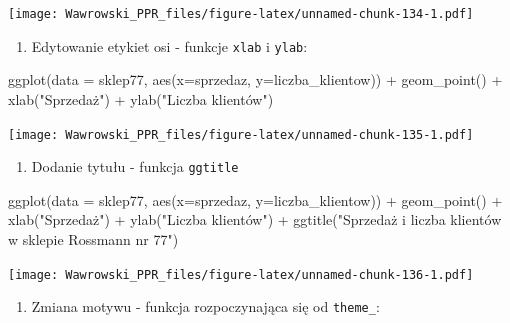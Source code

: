 \documentclass[
]{book}
\newenvironment{Shaded}{\begin{snugshade}}{\end{snugshade}}
\newcommand{\AttributeTok}[1]{\textcolor[rgb]{0.77,0.63,0.00}{#1}}
\newcommand{\FunctionTok}[1]{\textcolor[rgb]{0.00,0.00,0.00}{#1}}
\newcommand{\NormalTok}[1]{#1}
\newcommand{\SpecialCharTok}[1]{\textcolor[rgb]{0.00,0.00,0.00}{#1}}
\newcommand{\StringTok}[1]{\textcolor[rgb]{0.31,0.60,0.02}{#1}}
\providecommand{\tightlist}{%
  \setlength{\itemsep}{0pt}\setlength{\parskip}{0pt}}
\begin{document}
\texttt{[image: Wawrowski\_PPR\_files/figure-latex/unnamed-chunk-134-1.pdf]}

\begin{enumerate}
\def\labelenumi{\arabic{enumi}.}
\setcounter{enumi}{2}
\tightlist
\item
  Edytowanie etykiet osi - funkcje \texttt{xlab} i \texttt{ylab}:
\end{enumerate}

\begin{Shaded}
\begin{Highlighting}[]
\FunctionTok{ggplot}\NormalTok{(}\AttributeTok{data =}\NormalTok{ sklep77, }\FunctionTok{aes}\NormalTok{(}\AttributeTok{x=}\NormalTok{sprzedaz, }\AttributeTok{y=}\NormalTok{liczba\_klientow)) }\SpecialCharTok{+}
  \FunctionTok{geom\_point}\NormalTok{() }\SpecialCharTok{+}
  \FunctionTok{xlab}\NormalTok{(}\StringTok{"Sprzedaż"}\NormalTok{) }\SpecialCharTok{+}
  \FunctionTok{ylab}\NormalTok{(}\StringTok{"Liczba klientów"}\NormalTok{)}
\end{Highlighting}
\end{Shaded}

\texttt{[image: Wawrowski\_PPR\_files/figure-latex/unnamed-chunk-135-1.pdf]}

\begin{enumerate}
\def\labelenumi{\arabic{enumi}.}
\setcounter{enumi}{3}
\tightlist
\item
  Dodanie tytułu - funkcja \texttt{ggtitle}
\end{enumerate}

\begin{Shaded}
\begin{Highlighting}[]
\FunctionTok{ggplot}\NormalTok{(}\AttributeTok{data =}\NormalTok{ sklep77, }\FunctionTok{aes}\NormalTok{(}\AttributeTok{x=}\NormalTok{sprzedaz, }\AttributeTok{y=}\NormalTok{liczba\_klientow)) }\SpecialCharTok{+}
  \FunctionTok{geom\_point}\NormalTok{() }\SpecialCharTok{+}
  \FunctionTok{xlab}\NormalTok{(}\StringTok{"Sprzedaż"}\NormalTok{) }\SpecialCharTok{+}
  \FunctionTok{ylab}\NormalTok{(}\StringTok{"Liczba klientów"}\NormalTok{) }\SpecialCharTok{+}
  \FunctionTok{ggtitle}\NormalTok{(}\StringTok{"Sprzedaż i liczba klientów w sklepie Rossmann nr 77"}\NormalTok{)}
\end{Highlighting}
\end{Shaded}

\texttt{[image: Wawrowski\_PPR\_files/figure-latex/unnamed-chunk-136-1.pdf]}

\begin{enumerate}
\def\labelenumi{\arabic{enumi}.}
\setcounter{enumi}{4}
\tightlist
\item
  Zmiana motywu - funkcja rozpoczynająca się od \texttt{theme\_}:
\end{enumerate}
\end{document}
